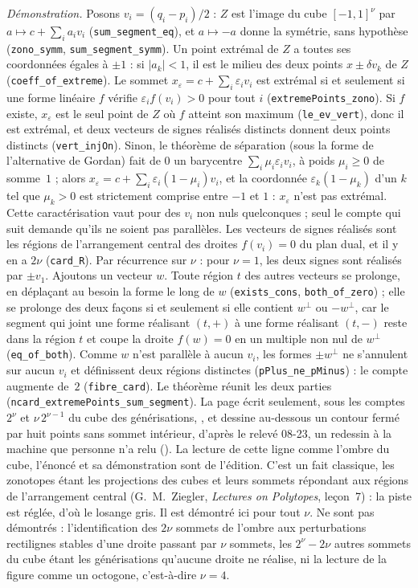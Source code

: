 {\small \emph{Démonstration.} Posons $v_i = (q_i - p_i)/2$ : $Z$ est l'image du cube $[-1, 1]^\nu$ par $a \mapsto c + \sum_i a_i v_i$ (\texttt{sum\_segment\_eq}), et $a \mapsto -a$ donne la symétrie, sans hypothèse (\texttt{zono\_symm}, \texttt{sum\_segment\_symm}). Un point extrémal de $Z$ a toutes ses coordonnées égales à $\pm 1$ : si $|a_k| < 1$, il est le milieu des deux points $x \pm \delta v_k$ de $Z$ (\texttt{coeff\_of\_extreme}). Le sommet $x_\varepsilon = c + \sum_i \varepsilon_i v_i$ est extrémal si et seulement si une forme linéaire $f$ vérifie $\varepsilon_i f(v_i) > 0$ pour tout $i$ (\texttt{extremePoints\_zono}). Si $f$ existe, $x_\varepsilon$ est le seul point de $Z$ où $f$ atteint son maximum (\texttt{le\_ev\_vert}), donc il est extrémal, et deux vecteurs de signes réalisés distincts donnent deux points distincts (\texttt{vert\_injOn}). Sinon, le théorème de séparation (sous la forme de l'alternative de Gordan) fait de $0$ un barycentre $\sum_i \mu_i \varepsilon_i v_i$, à poids $\mu_i \geq 0$ de somme~$1$ ; alors $x_\varepsilon = c + \sum_i \varepsilon_i (1 - \mu_i) v_i$, et la coordonnée $\varepsilon_k (1 - \mu_k)$ d'un $k$ tel que $\mu_k > 0$ est strictement comprise entre $-1$ et $1$ : $x_\varepsilon$ n'est pas extrémal. Cette caractérisation vaut pour des $v_i$ non nuls quelconques ; seul le compte qui suit demande qu'ils ne soient pas parallèles. Les vecteurs de signes réalisés sont les régions de l'arrangement central des droites $f(v_i) = 0$ du plan dual, et il y en a $2\nu$ (\texttt{card\_R}). Par récurrence sur $\nu$ : pour $\nu = 1$, les deux signes sont réalisés par $\pm v_1$. Ajoutons un vecteur $w$. Toute région $t$ des autres vecteurs se prolonge, en déplaçant au besoin la forme le long de $w$ (\texttt{exists\_cons}, \texttt{both\_of\_zero}) ; elle se prolonge des deux façons si et seulement si elle contient $w^\perp$ ou $-w^\perp$, car le segment qui joint une forme réalisant $(t, +)$ à une forme réalisant $(t, -)$ reste dans la région $t$ et coupe la droite $f(w) = 0$ en un multiple non nul de $w^\perp$ (\texttt{eq\_of\_both}). Comme $w$ n'est parallèle à aucun $v_i$, les formes $\pm w^\perp$ ne s'annulent sur aucun $v_i$ et définissent deux régions distinctes (\texttt{pPlus\_ne\_pMinus}) : le compte augmente de~$2$ (\texttt{fibre\_card}). Le théorème réunit les deux parties (\texttt{ncard\_extremePoints\_sum\_segment}). La page écrit seulement, sous les comptes $2^\nu$ et $\nu\,2^{\nu-1}$ du cube des générisations, , et dessine au-dessous un contour fermé par huit points sans sommet intérieur, d'après le relevé 08-23, un redessin à la machine que personne n'a relu (). La lecture de cette ligne comme l'ombre du cube, l'énoncé et sa démonstration sont de l'édition. C'est un fait classique, les zonotopes étant les projections des cubes et leurs sommets répondant aux régions de l'arrangement central (G.~M.~Ziegler, \emph{Lectures on Polytopes}, leçon~7) : la piste est réglée, d'où le losange gris. Il est démontré ici pour tout $\nu$. Ne sont pas démontrés : l'identification des $2\nu$ sommets de l'ombre aux perturbations rectilignes stables d'une droite passant par $\nu$ sommets, les $2^\nu - 2\nu$ autres sommets du cube étant les générisations qu'aucune droite ne réalise, ni la lecture de la figure comme un octogone, c'est-à-dire $\nu = 4$.\par}
